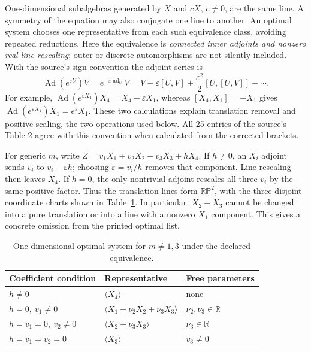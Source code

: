 \documentclass[11pt]{article}
\theoremstyle{definition}
\begin{document}
One-dimensional subalgebras generated by $X$ and $cX$, $c\ne0$, are the
same line. A symmetry of the equation may also conjugate one line to
another. An optimal system chooses one representative from each such
equivalence class, avoiding repeated reductions. Here the equivalence is
\emph{connected inner adjoints and nonzero real line rescaling}; outer or
discrete automorphisms are not silently included. With the source's sign
convention the adjoint series is
\begin{equation}
 \operatorname{Ad}(e^{\varepsilon U})V
 =e^{-\varepsilon\operatorname{ad}_U}V
 =V-\varepsilon[U,V]+\frac{\varepsilon^2}{2}[U,[U,V]]-\cdots.
 \label{eq:sve-adjoint-series}
\end{equation}
For example,
$\operatorname{Ad}(e^{\varepsilon X_1})X_4=X_4-\varepsilon X_1$,
whereas $[X_4,X_1]=-X_1$ gives
$\operatorname{Ad}(e^{\varepsilon X_4})X_1=e^\varepsilon X_1$.
These two calculations explain translation removal and positive scaling,
the two operations used below. All 25 entries of the source's Table 2
agree with this convention when calculated from the corrected brackets.

For generic $m$, write $Z=v_1X_1+v_2X_2+v_3X_3+hX_4$.
If $h\ne0$, an $X_i$ adjoint sends $v_i$ to $v_i-\varepsilon h$;
choosing $\varepsilon=v_i/h$ removes that component. Line rescaling then
leaves $X_4$. If $h=0$, the only nontrivial adjoint rescales all three
$v_i$ by the same positive factor. Thus the translation lines form
$\mathbb{RP}^2$, with the three disjoint coordinate charts shown in
Table~\ref{tab:sve-optimal-generic}. In particular, $X_2+X_3$ cannot
be changed into a pure translation or into a line with a nonzero $X_1$
component. This gives a concrete omission from the printed optimal list.

\begin{table}[htbp]
\centering\small
\begin{tabular}{@{}lll@{}}
\toprule
Coefficient condition & Representative & Free parameters\\
\midrule
$h\ne0$ & $\langle X_4\rangle$ & none\\
$h=0,\ v_1\ne0$ & $\langle X_1+\nu_2X_2+\nu_3X_3\rangle$ & $\nu_2,\nu_3\in\mathbb R$\\
$h=v_1=0,\ v_2\ne0$ & $\langle X_2+\nu_3X_3\rangle$ & $\nu_3\in\mathbb R$\\
$h=v_1=v_2=0$ & $\langle X_3\rangle$ & $v_3\ne0$\\
\bottomrule
\end{tabular}
\caption{One-dimensional optimal system for $m\ne1,3$ under the declared equivalence.}
\label{tab:sve-optimal-generic}
\end{table}
\end{document}
